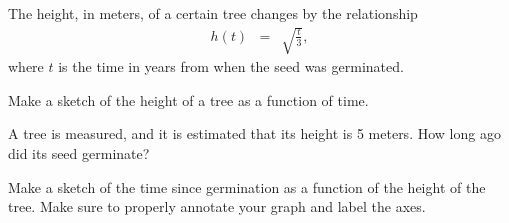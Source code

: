 
\begin{problem}
\item The height, in meters, of a certain tree changes by the
  relationship
  \begin{eqnarray*}
    h(t) & = & \sqrt{\frac{t}{3}},
  \end{eqnarray*}
  where $t$ is the time in years from when the seed was germinated. 
  \begin{subproblem}
  \item Make a sketch of the height of a tree as a function of time.
    \vfill
  \item A tree is measured, and it is estimated that its height is 5
    meters. How long ago did its seed germinate?
    \vfill
  \item Make a sketch of the time since germination as a function of
    the height of the tree.  Make sure to properly annotate your graph
    and label the axes.
    \vfill
  \end{subproblem}

  \clearpage

\end{problem}


